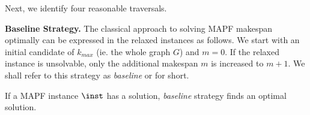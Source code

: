 Next, we identify four reasonable traversals.
%

\textbf{Baseline Strategy.}
%
The classical approach to solving MAPF makespan optimally can be expressed in the relaxed instances as follows. We start with an initial candidate of $k_{max}$ (ie. the whole graph $G$) and $m=0$. If the relaxed instance is unsolvable, only the additional makespan $m$ is increased to $m+1$. %
We shall refer to this strategy as \emph{baseline} or \ssb{} for short.
%
\begin{prop}\label{prop:baseline}
If a MAPF instance $\inst$ has a solution, \emph{baseline} strategy finds an optimal solution.
\end{prop}


